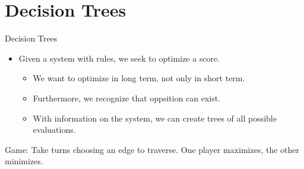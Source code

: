 \documentclass[11pt]{beamer}
\begin{document}
\section{Decision Trees}

\begin{frame}{Decision Trees}
\begin{itemize}
    \item Given a system with rules, we seek to optimize a score.
    \begin{itemize}
        \item We want to optimize in long term, not only in short term.
        \item Furthermore, we recognize that oppsition can exist.
        \item With information on the system, we can create trees of all possible evaluations.
    \end{itemize}
\end{itemize}

\begin{center}

Game: Take turns choosing an edge to traverse. One player maximizes, the other minimizes.
\end{center}

\end{frame}
\end{document}

